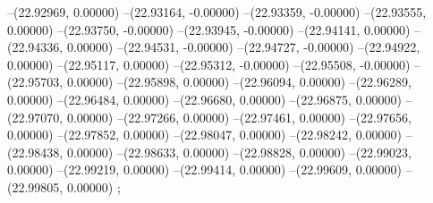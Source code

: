 --(22.92969, 0.00000)
--(22.93164, -0.00000)
--(22.93359, -0.00000)
--(22.93555, 0.00000)
--(22.93750, -0.00000)
--(22.93945, -0.00000)
--(22.94141, 0.00000)
--(22.94336, 0.00000)
--(22.94531, -0.00000)
--(22.94727, -0.00000)
--(22.94922, 0.00000)
--(22.95117, 0.00000)
--(22.95312, -0.00000)
--(22.95508, -0.00000)
--(22.95703, 0.00000)
--(22.95898, 0.00000)
--(22.96094, 0.00000)
--(22.96289, 0.00000)
--(22.96484, 0.00000)
--(22.96680, 0.00000)
--(22.96875, 0.00000)
--(22.97070, 0.00000)
--(22.97266, 0.00000)
--(22.97461, 0.00000)
--(22.97656, 0.00000)
--(22.97852, 0.00000)
--(22.98047, 0.00000)
--(22.98242, 0.00000)
--(22.98438, 0.00000)
--(22.98633, 0.00000)
--(22.98828, 0.00000)
--(22.99023, 0.00000)
--(22.99219, 0.00000)
--(22.99414, 0.00000)
--(22.99609, 0.00000)
--(22.99805, 0.00000)
;
